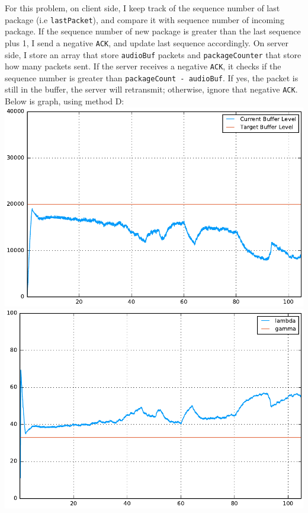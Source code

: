 \documentclass[12pt]{article}
\newenvironment{problem}[2][Problem]{\begin{trivlist}
\item[\hskip \labelsep {\bfseries #1}\hskip \labelsep {\bfseries #2.}]}{\end{trivlist}}
\begin{document}
\begin{problem}{2}
    For this problem, on client side, I keep track of the sequence number of last package (i.e \texttt{lastPacket}), and compare it with sequence number of incoming package. If the sequence number of new package is greater than the last sequence plus 1, I send a  negative \texttt{ACK}, and update last sequence accordingly. 
    On server side, I store an array that store \texttt{audioBuf} packets and \texttt{packageCounter} that store how many packets sent. If the server receives a negative \texttt{ACK}, it checks if the sequence number is greater than \texttt{packageCount - audioBuf}. If yes, the packet is still in the buffer, the server will retransmit; otherwise, ignore that negative \texttt{ACK}.    
    \\
    Below is graph, using method D:\\
    \includegraphics[scale = .5]{q2listen3.pdf}
    \includegraphics[scale = .5]{q2stream3.pdf}
\end{problem}
\end{document}
